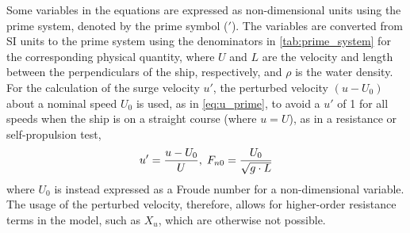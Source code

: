 \noindent Some variables in the equations are expressed as non-dimensional units using the prime system, denoted by the prime symbol ($'$). The variables are converted from SI units to the prime system using the denominators in \autoref{tab:prime_system} for the corresponding physical quantity, where $U$ and $L$ are the velocity and length between the perpendiculars of the ship, respectively, and $\rho$ is the water density.
For the calculation of the surge velocity $u'$, the perturbed velocity $(u-U_0)$ about a nominal speed $U_0$ is used, as in  \autoref{eq:u_prime}, to avoid a $u'$ of 1 for all speeds when the ship is on a straight course (where $u=U$), as in a resistance or self-propulsion test, 
\begin{equation}
    \label{eq:u_prime}
    u' = \frac{u-U_0}{U}, \hspace{0.1cm}
    F_{n0} = \frac{U_0}{\sqrt{g \cdot L}}
\end{equation}
where $U_0$ is instead expressed as a Froude number for a non-dimensional variable.
The usage of the perturbed velocity, therefore, allows for higher-order resistance terms in the model, such as $X_{u}$, which are otherwise not possible. 
